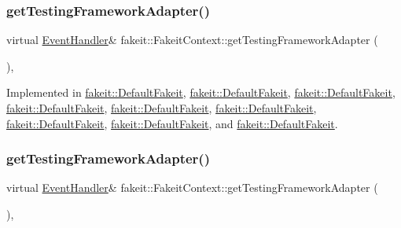 \subsubsection{\texorpdfstring{getTestingFrameworkAdapter()}{getTestingFrameworkAdapter()}\hspace{0.1cm}{\footnotesize\ttfamily [8/9]}}
{\footnotesize\ttfamily virtual \mbox{\hyperlink{structfakeit_1_1EventHandler}{Event\+Handler}}\& fakeit\+::\+Fakeit\+Context\+::get\+Testing\+Framework\+Adapter (\begin{DoxyParamCaption}{ }\end{DoxyParamCaption})\hspace{0.3cm}{\ttfamily [protected]}, {}}



Implemented in \mbox{\hyperlink{classfakeit_1_1DefaultFakeit_af01d86eee74123b4794c07aac3767ad7}{fakeit\+::\+Default\+Fakeit}}, \mbox{\hyperlink{classfakeit_1_1DefaultFakeit_af01d86eee74123b4794c07aac3767ad7}{fakeit\+::\+Default\+Fakeit}}, \mbox{\hyperlink{classfakeit_1_1DefaultFakeit_af01d86eee74123b4794c07aac3767ad7}{fakeit\+::\+Default\+Fakeit}}, \mbox{\hyperlink{classfakeit_1_1DefaultFakeit_af01d86eee74123b4794c07aac3767ad7}{fakeit\+::\+Default\+Fakeit}}, \mbox{\hyperlink{classfakeit_1_1DefaultFakeit_af01d86eee74123b4794c07aac3767ad7}{fakeit\+::\+Default\+Fakeit}}, \mbox{\hyperlink{classfakeit_1_1DefaultFakeit_af01d86eee74123b4794c07aac3767ad7}{fakeit\+::\+Default\+Fakeit}}, \mbox{\hyperlink{classfakeit_1_1DefaultFakeit_af01d86eee74123b4794c07aac3767ad7}{fakeit\+::\+Default\+Fakeit}}, \mbox{\hyperlink{classfakeit_1_1DefaultFakeit_af01d86eee74123b4794c07aac3767ad7}{fakeit\+::\+Default\+Fakeit}}, and \mbox{\hyperlink{classfakeit_1_1DefaultFakeit_af01d86eee74123b4794c07aac3767ad7}{fakeit\+::\+Default\+Fakeit}}.

\mbox{\label{structfakeit_1_1FakeitContext_a4be017ccd6c80cdafc02bd1985f183c8}} 
\subsubsection{\texorpdfstring{getTestingFrameworkAdapter()}{getTestingFrameworkAdapter()}\hspace{0.1cm}{\footnotesize\ttfamily [9/9]}}
{\footnotesize\ttfamily virtual \mbox{\hyperlink{structfakeit_1_1EventHandler}{Event\+Handler}}\& fakeit\+::\+Fakeit\+Context\+::get\+Testing\+Framework\+Adapter (\begin{DoxyParamCaption}{ }\end{DoxyParamCaption})\hspace{0.3cm}{\ttfamily [protected]}, {}}



